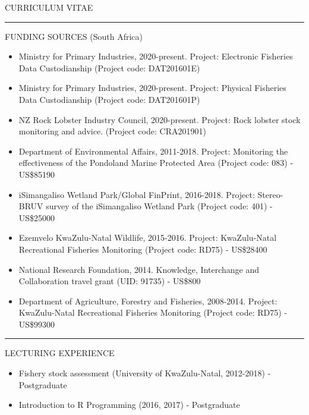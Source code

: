 \documentclass[10pt,a4paper]{article}
\begin{document}
\newpage
\begin{center}
\color{gray}CURRICULUM VITAE\\
\end{center}
\hrule
\vspace{6pt}
\noindent
FUNDING SOURCES (South Africa)
	\begin{itemize}
	\setlength\itemsep{0.05em}
	\item Ministry for Primary Industries, 2020-present. Project: Electronic Fisheries Data Custodianship (Project code: DAT201601E)  
	\item Ministry for Primary Industries, 2020-present. Project: Physical Fisheries Data Custodianship (Project code: DAT201601P)  
	\item NZ Rock Lobster Industry Council, 2020-present. Project: Rock lobster stock monitoring and advice. (Project code: CRA201901)
	\item Department of Environmental Affairs, 2011-2018. Project: Monitoring the effectiveness of the Pondoland Marine Protected Area (Project code: 083) - US\$85190
	\item iSimangaliso Wetland Park/Global FinPrint, 2016-2018. Project: Stereo-BRUV survey of the iSimangaliso Wetland Park (Project code: 401) - US\$25000
	\item Ezemvelo KwaZulu-Natal Wildlife, 2015-2016. Project: KwaZulu-Natal Recreational Fisheries Monitoring (Project code: RD75) - US\$28400
	\item National Research Foundation, 2014. Knowledge, Interchange and Collaboration travel grant (UID: 91735) - US\$800
	\item Department of Agriculture, Forestry and Fisheries, 2008-2014. Project: KwaZulu-Natal Recreational Fisheries Monitoring (Project code: RD75) - US\$99300  
	\end{itemize}
\hrule	
\vspace{6pt}
\noindent
LECTURING EXPERIENCE
	\begin{itemize}
		\setlength\itemsep{0.05em}
		\item Fishery stock assessment (University of KwaZulu-Natal, 2012-2018) - Postgraduate
		\item Introduction to R Programming (2016, 2017) - Postgraduate
	\end{itemize}
\end{document}
